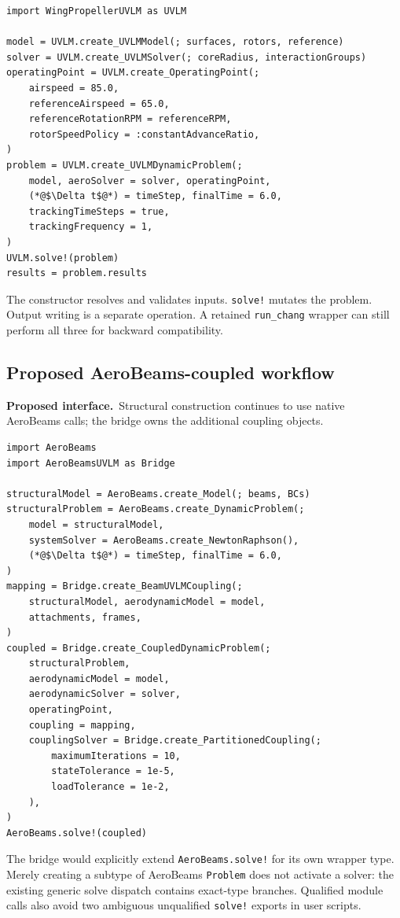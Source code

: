 \documentclass[11pt,a4paper]{article}
\newcommand{\code}{\nolinkurl}
\newcommand{\proposed}{\textbf{Proposed interface.}\ }
\begin{document}
\begin{lstlisting}
import WingPropellerUVLM as UVLM

model = UVLM.create_UVLMModel(; surfaces, rotors, reference)
solver = UVLM.create_UVLMSolver(; coreRadius, interactionGroups)
operatingPoint = UVLM.create_OperatingPoint(;
    airspeed = 85.0,
    referenceAirspeed = 65.0,
    referenceRotationRPM = referenceRPM,
    rotorSpeedPolicy = :constantAdvanceRatio,
)
problem = UVLM.create_UVLMDynamicProblem(;
    model, aeroSolver = solver, operatingPoint,
    (*@$\Delta t$@*) = timeStep, finalTime = 6.0,
    trackingTimeSteps = true,
    trackingFrequency = 1,
)
UVLM.solve!(problem)
results = problem.results
\end{lstlisting}

The constructor resolves and validates inputs. \code{solve!} mutates the
problem. Output writing is a separate operation. A retained \code{run_chang}
wrapper can still perform all three for backward compatibility.

\subsection{Proposed AeroBeams-coupled workflow}

\proposed Structural construction continues to use native AeroBeams calls;
the bridge owns the additional coupling objects.

\begin{lstlisting}
import AeroBeams
import AeroBeamsUVLM as Bridge

structuralModel = AeroBeams.create_Model(; beams, BCs)
structuralProblem = AeroBeams.create_DynamicProblem(;
    model = structuralModel,
    systemSolver = AeroBeams.create_NewtonRaphson(),
    (*@$\Delta t$@*) = timeStep, finalTime = 6.0,
)
mapping = Bridge.create_BeamUVLMCoupling(;
    structuralModel, aerodynamicModel = model,
    attachments, frames,
)
coupled = Bridge.create_CoupledDynamicProblem(;
    structuralProblem,
    aerodynamicModel = model,
    aerodynamicSolver = solver,
    operatingPoint,
    coupling = mapping,
    couplingSolver = Bridge.create_PartitionedCoupling(;
        maximumIterations = 10,
        stateTolerance = 1e-5,
        loadTolerance = 1e-2,
    ),
)
AeroBeams.solve!(coupled)
\end{lstlisting}

The bridge would explicitly extend \code{AeroBeams.solve!} for its own wrapper
type. Merely creating a subtype of AeroBeams \code{Problem} does not activate
a solver: the existing generic solve dispatch contains exact-type branches.
Qualified module calls also avoid two ambiguous unqualified \code{solve!}
exports in user scripts.
\end{document}
